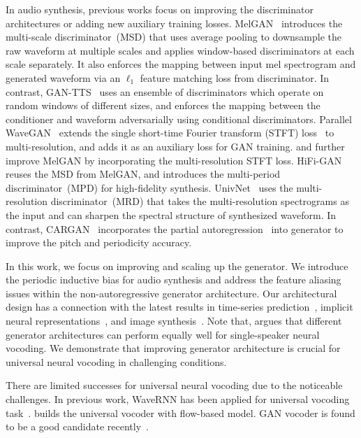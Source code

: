 \documentclass{article} \usepackage{iclr2023_conference,times}
\theoremstyle{plain}
\theoremstyle{definition}
\theoremstyle{remark}
\begin{document}
In audio synthesis, previous works focus on improving the discriminator architectures or adding new auxiliary training losses.
MelGAN~\citep{kumar2019melgan} introduces the multi-scale discriminator~(MSD) that uses average pooling to downsample the raw waveform at multiple scales and applies window-based discriminators at each scale separately. It also enforces the mapping between input mel spectrogram and generated waveform via an $\ell_1$ feature matching loss from discriminator.
In contrast, GAN-TTS~\citep{binkowski2020high} uses an ensemble of discriminators which operate on random windows of different sizes, and enforces the mapping between the conditioner and waveform adversarially using conditional discriminators.
Parallel WaveGAN~\citep{yamamoto2020parallel} extends the single short-time Fourier transform (STFT) loss~\citep{ping2018clarinet} to multi-resolution, and adds it as an auxiliary loss for GAN training.
\cite{yang2021multi} and \cite{mustafa2021stylemelgan} further improve MelGAN by incorporating the multi-resolution STFT loss.
HiFi-GAN~\citep{kong2020hifi} reuses the MSD from MelGAN, and introduces the multi-period discriminator~(MPD) for high-fidelity synthesis. 
UnivNet~\citep{jang2020universal, jang2021univnet} uses the multi-resolution discriminator~(MRD) that takes the multi-resolution spectrograms as the input and can sharpen the spectral structure of synthesized waveform.
In contrast, CARGAN~\citep{morrison2021chunked} incorporates the partial autoregression~\citep{ping2019waveflow} into generator to improve the pitch and periodicity accuracy.

In this work, we focus on improving and scaling up the generator. We introduce the periodic inductive bias for audio synthesis and address the feature aliasing issues within the non-autoregressive generator architecture. Our architectural design  has a connection with the latest results in time-series prediction~\citep{liu2020neural}, {implicit neural representations~\citep{sitzmann2020implicit}}, and image synthesis~\citep{karras2021alias}.
Note that, \citet{you2021gan} argues that different generator architectures can perform equally well for single-speaker neural vocoding.
We demonstrate that improving generator architecture is  crucial for universal neural vocoding in challenging conditions.


There are limited successes for universal neural vocoding due to the noticeable challenges.
In previous work, WaveRNN has been applied for universal vocoding task~\citep{lorenzo2018towards, paul2020speaker}. \citet{jiao2021universal} builds the  universal vocoder with flow-based model.
GAN vocoder is found to be a good candidate recently~\citep{jang2021univnet}.
\end{document}

